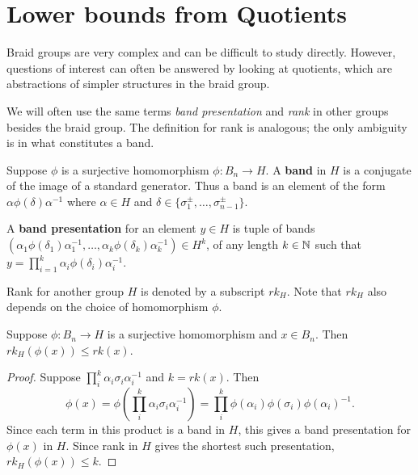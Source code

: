 \documentclass[12pt]{thesis}
\begin{document}
\section{Lower bounds from Quotients}

Braid groups are very complex and can be difficult to study directly.
However, questions of interest can often be answered by looking
at quotients, which are abstractions of simpler structures in the braid group.

We will often use the same terms \textit{band presentation} and \textit{rank}
in other groups besides the braid group.
The definition for rank is analogous; the only ambiguity is in what constitutes a band.
\begin{definition}
    Suppose $\phi$ is a surjective homomorphism $\phi \colon B_{n} \rightarrow H$.
    A \textbf{band} in $H$ is a conjugate of the image of a standard generator.
    Thus a band is an element of the form $\alpha\phi(\delta)\alpha^{-1}$
    where $\alpha \in H$ and $\delta \in \{\sigma_{1}^{\pm}, \ldots, \sigma_{n-1}^{\pm} \}$.
\end{definition}

\begin{definition}
    \label{def:quotient-band-presentation}
    \begin{sloppypar}
    A \textbf{band presentation} for an element $y \in H$
    is tuple of bands $(\alpha_{1} \phi(\delta_{1}) \alpha_{1}^{-1}, \ldots,
        \alpha_{k} \phi(\delta_{k}) \alpha_{k}^{-1}) \in H^{k}$,
    of any length $k \in \mathbb{N}$
        such that $y = \prod_{i=1}^{k} \alpha_{i} \phi(\delta_{i}) \alpha_{i}^{-1}$.
    \end{sloppypar}
\end{definition}

Rank for another group $H$ is denoted by a subscript $rk_{H}$.
Note that $rk_{H}$ also depends on the choice of homomorphism $\phi$.

\begin{proposition}
    \label{prop:lower-bounds-from-quotient}
Suppose $\phi \colon B_{n} \rightarrow H$ is a surjective homomorphism and $x \in B_{n}$. Then $rk_{H}(\phi(x)) \leq rk(x)$.
\end{proposition}

\begin{proof}
Suppose $\prod_{i}^{k} \alpha_{i}\sigma_{i}\alpha_{i}^{-1}$
and $k = rk(x)$.
Then 
\[
    \phi(x)
    = \phi(\prod_{i}^{k} \alpha_{i}\sigma_{i}\alpha_{i}^{-1})
    = \prod_{i}^{k} \phi(\alpha_{i})\phi(\sigma_{i})\phi(\alpha_{i})^{-1}.
\]
Since each term in this product is a band in $H$, this gives a
band presentation for $\phi(x)$ in $H$.
Since rank in $H$ gives the shortest such presentation, $rk_{H}(\phi(x)) \leq k$.
\end{proof}
\end{document}
